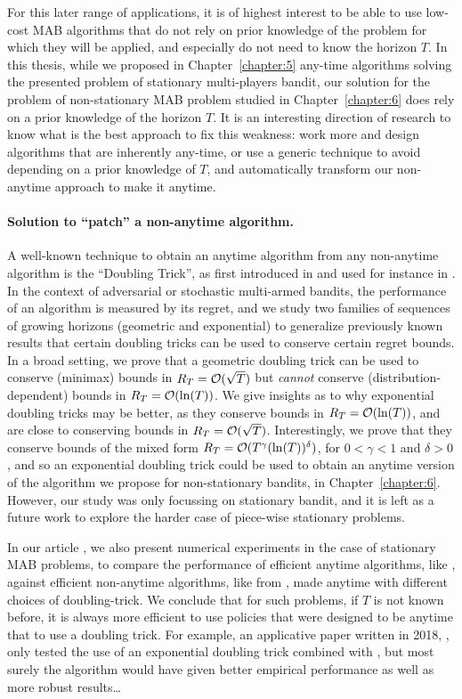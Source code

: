 For this later range of applications, it is of highest interest to be able to use low-cost MAB algorithms that do not rely on prior knowledge of the problem for which they will be applied, and especially do not need to know the horizon $T$.
In this thesis,
while we proposed in Chapter~\ref{chapter:5} any-time algorithms solving the presented problem of stationary multi-players bandit, our solution for the problem of non-stationary MAB problem studied in Chapter~\ref{chapter:6} does rely on a prior knowledge of the horizon $T$.
It is an interesting direction of research to know what is the best approach to fix this weakness: work more and design algorithms that are inherently any-time, or use a generic technique to avoid depending on a prior knowledge of $T$, and automatically transform our non-anytime approach to make it anytime.


\paragraph{Solution to ``patch'' a non-anytime algorithm.}
%
A well-known technique to obtain an anytime algorithm from any non-anytime algorithm is the ``Doubling Trick'', as first introduced in \cite{CesaLugosi06} and used for instance in \cite{Auer10,AuerGajaneOrtner18}.
%
In the context of adversarial or stochastic multi-armed bandits,
the performance of an algorithm is measured by its regret,
and we study two families of sequences of growing horizons (geometric and exponential)
to generalize previously known results that certain doubling tricks can be used to conserve certain regret bounds.
In a broad setting, we prove that a geometric doubling trick can be used to conserve (minimax) bounds in $R_T = \mathcal{O}(\sqrt{T})$ but \emph{cannot} conserve (distribution-dependent) bounds in $R_T = \mathcal{O}(\ln(T))$.
We give insights as to why exponential doubling tricks may be better, as they conserve bounds in $R_T = \mathcal{O}(\ln(T))$, and are close to conserving bounds in $R_T = \mathcal{O}(\sqrt{T})$.
Interestingly, we prove that they conserve bounds of the mixed form $R_T = \mathcal{O}(T^{\gamma} (\ln(T))^{\delta})$, for $0<\gamma<1$ and $\delta>0$, and so an exponential doubling trick could be used to obtain an anytime version of the algorithm we propose for non-stationary bandits, \GLRklUCB{} in Chapter~\ref{chapter:6}.
However, our study was only focussing on stationary bandit, and it is left as a future work to explore the harder case of piece-wise stationary problems.

In our article \cite{Besson2018DoublingTricks}, we also present numerical experiments in the case of stationary MAB problems, to compare the performance of efficient anytime algorithms, like \klUCB, against efficient non-anytime algorithms, like \KLUCBpp{} from \cite{Menard17}, made anytime with different choices of doubling-trick.
We conclude that for such problems, if $T$ is not known before, it is always more efficient to use policies that were designed to be anytime that to use a doubling trick.
For example, an applicative paper written in 2018, \cite{li2019useDoublingTrick}, only tested the use of an exponential doubling trick combined with \KLUCBpp, but most surely the \klUCB{} algorithm would have given better empirical performance as well as more robust results\ldots

